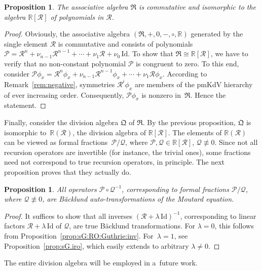 \documentclass[pdftex]{sigma}
\def\RR{{\mathbb R}}
\def\P{{\mathcal P}}
\def\Q{{\mathcal Q}}
\def\RO{{\mathcal R}}
\numberwithin{equation}{section}
\newtheorem{Proposition}[Theorem]{Proposition}
\theoremstyle{definition}
\begin{document}
\begin{Proposition}
The associative algebra $\mathfrak R$ is commutative and
isomorphic to the algebra $\mathbb R[\RO]$ of polynomials in $\RO$.
\end{Proposition}


\begin{proof}
Obviously, the associative algebra
$(\mathfrak R, +, 0, -, \circ, \mathbb R)$
generated by the single element $\RO$ is commutative
and consists of polynomials
$\mathcal P
 = \RO^n + \nu_{n-1} \RO^{n-1} + \cdots + \nu_1 \RO + \nu_0 \,\mathrm{Id}$.
To show that $\mathfrak R \cong \RR[\RO]$, we have to verify
that no non-constant polynomial $\mathcal P$ is congruent to zero.
To this end, consider $\mathcal P \phi_x = \RO^n \phi_x
 + \nu_{n-1} \RO^{n-1} \phi_x + \cdots + \nu_1 \RO \phi_x$.
According to Remark~\ref{rem:negative}, symmetries
$\RO^{i}\phi_x$ are members of the pmKdV
hierarchy of ever increasing order.
Consequently, $\mathcal P \phi_x$ is nonzero in~$\mathfrak R$.
Hence the statement.
\end{proof}


Finally, consider the division algebra $\mathfrak Q$ of $\mathfrak R$.
By the previous proposition, $\mathfrak Q$ is isomorphic to~$\RR(\RO)$,
the division algebra of $\RR[\RO]$.
The elements of $\RR(\RO)$
can be viewed as formal fractions~${\P/\Q}$,
where $\P,\Q \in \RR[\RO]$, $\Q \not\equiv 0$.
Since not all recursion operators are invertible
(for instance, the trivial ones),
some fractions need not correspond to true recursion operators,
in principle.
The next proposition proves that they actually do.


\begin{Proposition}
All operators $\P \circ \Q^{-1}$,
corresponding to formal fractions $\P/\Q$, where $\Q \not\equiv 0$,
are B\"acklund auto-transformations of the Moutard equation.
\end{Proposition}



\begin{proof}
It suffices to show that all inverses $(\RO + \lambda\,\mathrm{Id})^{-1}$,
corresponding to linear factors $\RO + \lambda\,\mathrm{Id}$ of $\Q$,
are true B\"acklund transformations.
For $\lambda = 0$,
this follows from Proposition~\ref{prop:sG:RO:Guthrie:inv}.
For~${\lambda = 1}$, see Proposition~\ref{prop:sG.iro},
which easily extends to arbitrary $\lambda \ne 0$.
\end{proof}


The entire division algebra will be employed in a~future work.
\end{document}
